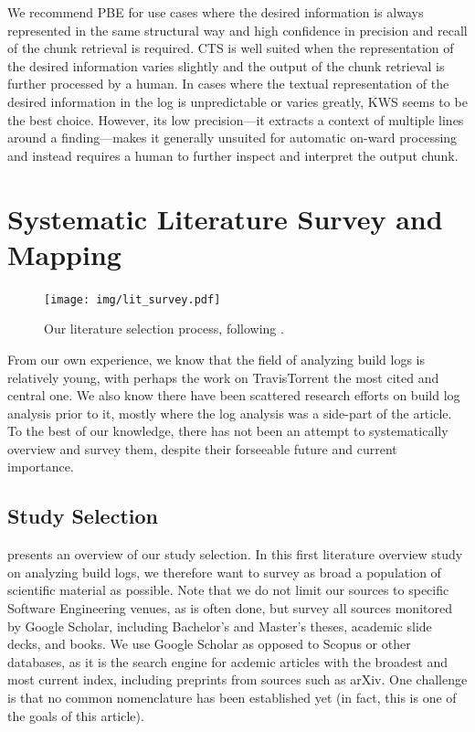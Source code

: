 We recommend PBE for use cases where the desired information is always
represented in the same structural way and high confidence in precision
and
recall of the chunk retrieval is required.
CTS is well suited when the representation of the desired information
varies
slightly and the output of the chunk retrieval is further processed by
a human.
In cases where the textual representation of the desired information in
the log
is unpredictable or varies greatly, KWS seems to be the best choice.
However,
its low precision---it extracts a context of multiple lines around a
finding---makes it generally unsuited for automatic on-ward processing and
instead requires a human to further inspect and interpret the output
chunk.


\section{Systematic Literature Survey and Mapping}
\label{sec:survey}

\begin{figure}[htb]
	\centering
	\texttt{[image: img/lit\_survey.pdf]}
	\caption{Our literature selection process, following
	\cite{petersen2015guidelines}.}
	\label{fig:lit-survey}
\end{figure}

From our own experience, we know that the field of analyzing build
logs is relatively young, with perhaps the work on TravisTorrent the
most cited and central one.
We also know there have been scattered
research efforts on build log analysis prior to it, mostly where the
log analysis was a side-part of the article.
To the best of our
knowledge, there has not been an attempt to systematically overview
and survey them, despite their forseeable future and current importance.

\subsection{Study Selection}
 presents an overview of our study selection.
In this first literature overview study on analyzing build logs, we
therefore want to survey as broad a population of scientific material
as possible.
Note that we do not limit our sources to specific
Software Engineering venues, as is often done, but survey all sources
monitored by Google Scholar, including Bachelor's and Master's theses,
academic slide decks, and books.
We use Google Scholar as opposed to
Scopus or other databases, as it is the search engine for acdemic
articles with the broadest and most current index, including preprints
from sources such as arXiv.
One challenge is that no common
nomenclature has been established yet (in fact, this is one of the
goals of this article).

